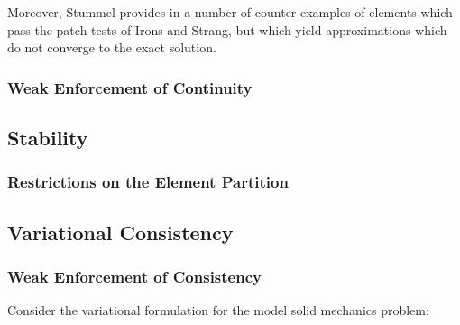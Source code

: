 Moreover, Stummel provides in \cite{Stummel:80} a number of counter-examples of elements which pass the patch tests of Irons and Strang, but which yield approximations which do not converge to the exact solution.

\subsubsection{Weak Enforcement of Continuity}
\subsection{Stability}
\subsubsection{Restrictions on the Element Partition}
\subsection{Variational Consistency}
\subsubsection{Weak Enforcement of Consistency}

Consider the variational formulation for the model solid mechanics problem:


